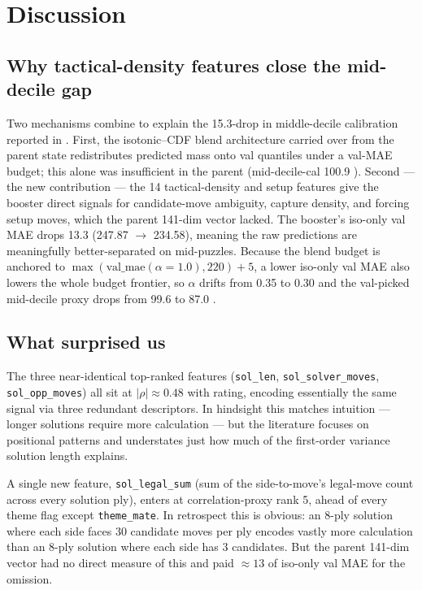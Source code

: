 \section{Discussion}
\label{sec:discussion}

\subsection{Why tactical-density features close the mid-decile gap}
Two mechanisms combine to explain the 15.3-\elo drop in middle-decile calibration reported in . First, the isotonic--CDF blend architecture carried over from the parent state redistributes predicted mass onto val quantiles under a val-MAE budget; this alone was insufficient in the parent (mid-decile-cal 100.9 \elo). Second --- the new contribution --- the 14 tactical-density and setup features give the booster direct signals for candidate-move ambiguity, capture density, and forcing setup moves, which the parent 141-dim vector lacked. The booster's iso-only val MAE drops 13.3 \elo (247.87 $\to$ 234.58), meaning the raw predictions are meaningfully better-separated on mid-\elo puzzles. Because the blend budget is anchored to $\max(\text{val\_mae}(\alpha=1.0), 220) + 5$, a lower iso-only val MAE also lowers the whole budget frontier, so $\alpha$ drifts from 0.35 to 0.30 and the val-picked mid-decile proxy drops from 99.6 to 87.0 \elo.

\subsection{What surprised us}
The three near-identical top-ranked features (\texttt{sol\_len}, \texttt{sol\_solver\_moves}, \texttt{sol\_opp\_moves}) all sit at $|\rho| \approx 0.48$ with rating, encoding essentially the same signal via three redundant descriptors. In hindsight this matches intuition --- longer solutions require more calculation --- but the literature focuses on positional patterns and understates just how much of the first-order variance solution length explains.

A single new feature, \texttt{sol\_legal\_sum} (sum of the side-to-move's legal-move count across every solution ply), enters at correlation-proxy rank 5, ahead of every theme flag except \texttt{theme\_mate}. In retrospect this is obvious: an 8-ply solution where each side faces 30 candidate moves per ply encodes vastly more calculation than an 8-ply solution where each side has 3 candidates. But the parent 141-dim vector had no direct measure of this and paid $\approx 13$ \elo of iso-only val MAE for the omission.

